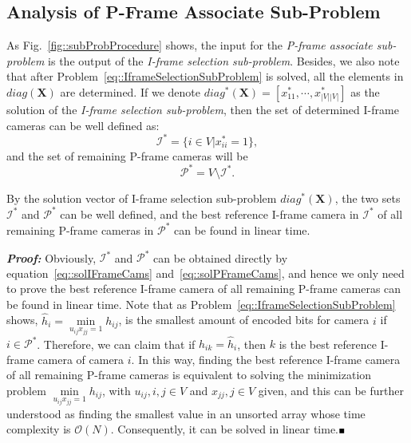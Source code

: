 \subsection{Analysis of P-Frame Associate Sub-Problem}
\label{sec::PFrameScheduling}
As Fig.~\ref{fig::subProbProcedure} shows, the input for the \emph{P-frame associate sub-problem} is the output of the \emph{I-frame selection sub-problem}.
Besides, we also note that after Problem~\eqref{eq::IframeSelectionSubProblem} is solved, all the elements in $diag(\mathbf{X})$ are determined.
If we denote ${diag^*(\mathbf{X}) = \left[ x_{11}^*, \cdots, x_{|V||V|}^* \right]}$ as the solution of the \emph{I-frame selection sub-problem}, then the set of determined I-frame cameras can be well defined as:
\begin{equation}
\mathcal{I}^* = \{ i \in V | x_{ii}^* = 1\},
\label{eq::solIFrameCams}
\end{equation}
and the set of remaining P-frame cameras will be
\begin{equation}
\mathcal{P}^* = V \setminus \mathcal{I}^*.
\label{eq::solPFrameCams}
\end{equation} 
%
\begin{mylem}
By the solution vector of I-frame selection sub-problem $diag^*(\mathbf{X})$, the two sets $\mathcal{I}^*$ and $\mathcal{P}^*$ can be well defined, and the best reference I-frame camera in $\mathcal{I}^*$ of all remaining P-frame cameras in $\mathcal{P}^*$ can be found in linear time.
\label{lemma::findBestICamEasy}
\end{mylem}
\textbf{\emph{Proof:}}
Obviously, $\mathcal{I}^*$ and $\mathcal{P}^*$ can be obtained directly by equation~\eqref{eq::solIFrameCams} and~\eqref{eq::solPFrameCams}, and hence we only need to prove the best reference I-frame camera of all remaining P-frame cameras can be found in linear time.
Note that as Problem~\eqref{eq::IframeSelectionSubProblem} shows, ${\hat{h}_i = \underset{u_{ij}x_{jj} = 1}{\min} h_{ij}}$, is the smallest amount of encoded bits for camera $i$ if $i \in \mathcal{P}^*$.
Therefore, we can claim that if $h_{ik} = \hat{h}_i$, then $k$ is the best reference I-frame camera of camera $i$.
In this way, finding the best reference I-frame camera of all remaining P-frame cameras is equivalent to solving the minimization problem ${\underset{u_{ij}x_{jj} = 1}{\min} h_{ij}}$, with ${u_{ij}, i,j \in V}$ and ${x_{jj}, j \in V}$ given, and this can be further understood as finding the smallest value in an unsorted array whose time complexity is $\mathcal{O}(N)$.
Consequently, it can be solved in linear time.\hfill$\mathsmaller{\mathsmaller{\blacksquare}}$

